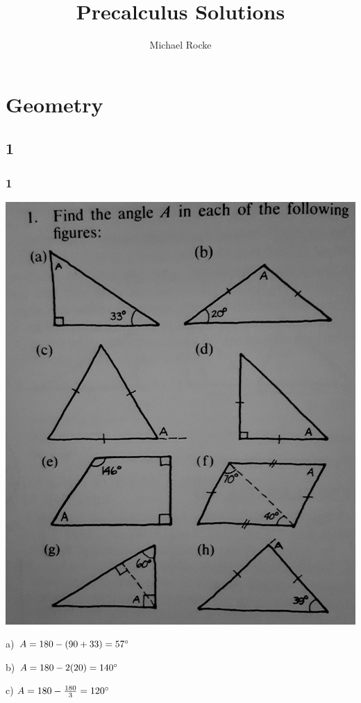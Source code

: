 \documentclass[]{report}
\title{Precalculus Solutions}
\author{Michael Rocke}
\begin{document}
\maketitle

\tableofcontents

\section{Geometry}
\subsection{1}


\subsubsection{1}
\includegraphics[width=\textwidth]{precalc-geo-section1-1.jpg}

a) $A = 180 - (90 + 33) = 57\degree$

b) $A = 180 - 2(20) = 140\degree$

c) $A = 180 - \frac{180}{3} = 120\degree$
\end{document}
